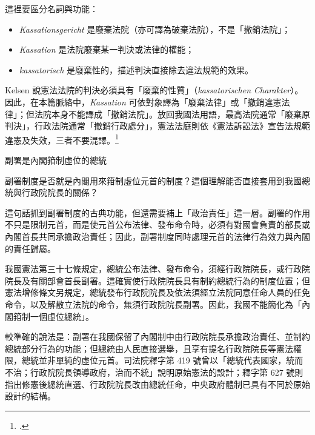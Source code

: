 這裡要區分名詞與功能：

\begin{itemize}
\tightlist
\item
  \emph{Kassationsgericht} 是廢棄法院（亦可譯為破棄法院），不是「撤銷法院」；
\item
  \emph{Kassation} 是法院廢棄某一判決或法律的權能；
\item
  \emph{kassatorisch} 是廢棄性的，描述判決直接除去違法規範的效果。
\end{itemize}

Kelsen 說憲法法院的判決必須具有「廢棄的性質」（\emph{kassatorischen Charakter}）。因此，在本篇脈絡中，\emph{Kassation} 可依對象譯為「廢棄法律」或「撤銷違憲法律」；但法院本身不能譯成「撤銷法院」。放回我國法用語，最高法院通常「廢棄原判決」，行政法院通常「撤銷行政處分」，憲法法庭則依《憲法訴訟法》宣告法規範違憲及失效，三者不要混譯。\footcites[61--64]{kelsen2015}[70--73]{kelsen1929}


\begin{qaprompt}
副署是內閣箝制虛位的總統
\end{qaprompt}

\begin{qaquestion}
副署制度是否就是內閣用來箝制虛位元首的制度？這個理解能否直接套用到我國總統與行政院院長的關係？
\end{qaquestion}

這句話抓到副署制度的古典功能，但還需要補上「政治責任」這一層。副署的作用不只是限制元首，而是使元首公布法律、發布命令時，必須有對國會負責的部長或內閣首長共同承擔政治責任；因此，副署制度同時處理元首的法律行為效力與內閣的責任歸屬。

我國憲法第三十七條規定，總統公布法律、發布命令，須經行政院院長，或行政院院長及有關部會首長副署。這確實使行政院院長具有制約總統行為的制度位置；但憲法增修條文另規定，總統發布行政院院長及依法須經立法院同意任命人員的任免命令，以及解散立法院的命令，無須行政院院長副署。因此，我國不能簡化為「內閣箝制一個虛位總統」。

較準確的說法是：副署在我國保留了內閣制中由行政院院長承擔政治責任、並制約總統部分行為的功能；但總統由人民直接選舉，且享有提名行政院院長等憲法權限，總統並非單純的虛位元首。司法院釋字第 419 號曾以「總統代表國家，統而不治；行政院院長領導政府，治而不統」說明原始憲法的設計；釋字第 627 號則指出修憲後總統直選、行政院院長改由總統任命，中央政府體制已具有不同於原始設計的結構。


